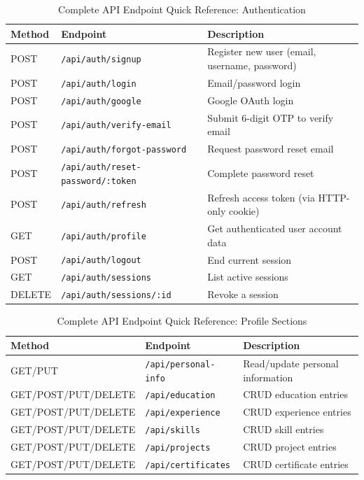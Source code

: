 \documentclass[12pt, a4paper, oneside]{report}
\begin{document}
\begin{table}[H]
\centering
\caption{Complete API Endpoint Quick Reference: Authentication}
\label{tab:api_full_reference_auth}
\renewcommand{\arraystretch}{1.3}
\begin{tabularx}{\textwidth}{|p{2cm}|p{8cm}|X|}
\hline
\textbf{Method} & \textbf{Endpoint} & \textbf{Description} \\
\hline
POST & \texttt{/api/auth/signup} & Register new user (email, username, password) \\
POST & \texttt{/api/auth/login} & Email/password login \\
POST & \texttt{/api/auth/google} & Google OAuth login \cite{oauth2012} \\
POST & \texttt{/api/auth/verify-email} & Submit 6-digit OTP to verify email \\
POST & \texttt{/api/auth/forgot-password} & Request password reset email \\
POST & \texttt{/api/auth/reset-password/:token} & Complete password reset \\
POST & \texttt{/api/auth/refresh} & Refresh access token (via HTTP-only cookie) \\
GET  & \texttt{/api/auth/profile} & Get authenticated user account data \\
POST & \texttt{/api/auth/logout} & End current session \\
GET  & \texttt{/api/auth/sessions} & List active sessions \\
DELETE & \texttt{/api/auth/sessions/:id} & Revoke a session \\
\hline
\end{tabularx}
\end{table}

\begin{table}[H]
\centering
\caption{Complete API Endpoint Quick Reference: Profile Sections}
\label{tab:api_full_reference_profile}
\renewcommand{\arraystretch}{1.3}
\begin{tabularx}{\textwidth}{|p{5cm}|p{5cm}|X|}
\hline
\textbf{Method} & \textbf{Endpoint} & \textbf{Description} \\
\hline
GET/PUT& \texttt{/api/personal-info} & Read/update personal information \\
GET/POST/PUT/DELETE & \texttt{/api/education} & CRUD education entries \\
GET/POST/PUT/DELETE & \texttt{/api/experience} & CRUD experience entries \\
GET/POST/PUT/DELETE & \texttt{/api/skills} & CRUD skill entries \\
GET/POST/PUT/DELETE & \texttt{/api/projects} & CRUD project entries \\
GET/POST/PUT/DELETE & \texttt{/api/certificates} & CRUD certificate entries \\
\hline
\end{tabularx}
\end{table}
\end{document}
